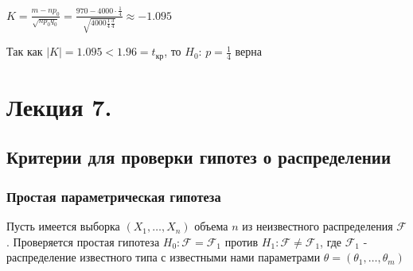 \documentclass[12pt]{article}
\begin{document}
$K = \frac{m - np_0}{\sqrt{np_0 q_0}} = \frac{970 - 4000 \cdot \frac{1}{4}}{\sqrt{4000 \frac{1}{4} \frac{3}{4}}} \approx -1.095$

Так как $|K| = 1.095 < 1.96 = t_\text{кр}$, то $H_0: \, p = \frac{1}{4}$ верна







\section{Лекция 7.}

\subsection{Критерии для проверки гипотез о распределении}

\subsubsection{Простая параметрическая гипотеза}

Пусть имеется выборка $(X_1, \dots, X_n)$ объема $n$ из неизвестного распределения $\mathcal{F}$. 
Проверяется простая гипотеза $H_0 : \mathcal{F} = \mathcal{F}_1$ против $H_1 : \mathcal{F} \neq \mathcal{F}_1$, где $\mathcal{F}_1$ - распределение известного типа с 
известными нами параметрами $\theta = (\theta_1, \dots, \theta_m)$
\end{document}
